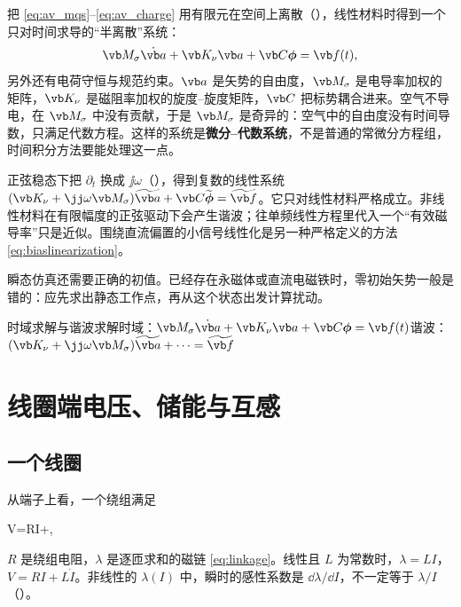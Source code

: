 把 \eqref{eq:av_mqs}--\eqref{eq:av_charge} 用有限元在空间上离散（），线性材料时得到一个只对时间求导的“半离散”系统：
\begin{equation}
\vb M_\sigma\dot{\vb a}+\vb K_\nu\vb a+\vb C\boldsymbol\phi=\vb f(t),
\end{equation}
另外还有电荷守恒与规范约束。$\vb a$ 是矢势的自由度，$\vb M_\sigma$ 是电导率加权的矩阵，$\vb K_\nu$ 是磁阻率加权的旋度--旋度矩阵，$\vb C$ 把标势耦合进来。空气不导电，在 $\vb M_\sigma$ 中没有贡献，于是 $\vb M_\sigma$ 是奇异的：空气中的自由度没有时间导数，只满足代数方程。这样的系统是\textbf{微分--代数系统}，不是普通的常微分方程组，时间积分方法要能处理这一点。

正弦稳态下把 $\partial_t$ 换成 $\jj\omega$（），得到复数的线性系统 $(\vb K_\nu+\jj\omega\vb M_\sigma)\widetilde{\vb a}+\vb C\widetilde{\boldsymbol\phi}=\widetilde{\vb f}$。它只对线性材料严格成立。非线性材料在有限幅度的正弦驱动下会产生谐波；往单频线性方程里代入一个“有效磁导率”只是近似。围绕直流偏置的小信号线性化是另一种严格定义的方法 \eqref{eq:biaslinearization}。

瞬态仿真还需要正确的初值。已经存在永磁体或直流电磁铁时，零初始矢势一般是错的：应先求出静态工作点，再从这个状态出发计算扰动。

\begin{compare}{时域求解与谐波求解}{时域：$\vb M_\sigma\dot{\vb a}+\vb K_\nu\vb a+\vb C\boldsymbol\phi=\vb f(t)$}{谐波：$(\vb K_\nu+\jj\omega\vb M_\sigma)\widetilde{\vb a}+\dots=\widetilde{\vb f}$}
\end{compare}

\section{线圈端电压、储能与互感}\label{sec:eddy-circuit}

\subsection{一个线圈}
从端子上看，一个绕组满足
\begin{keyeq}
V=RI+,
\label{eq:circuit}
\end{keyeq}
$R$ 是绕组电阻，$\lambda$ 是逐匝求和的磁链 \eqref{eq:linkage}。线性且 $L$ 为常数时，$\lambda=LI$，$V=RI+L\dot I$。非线性的 $\lambda(I)$ 中，瞬时的感性系数是 $\dd\lambda/\dd I$，不一定等于 $\lambda/I$（）。


